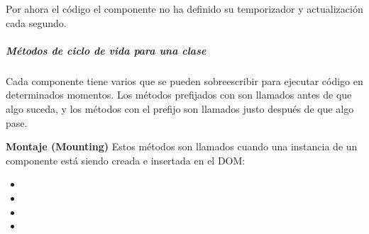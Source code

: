 %
\begin{sphinxVerbatim}[commandchars=\\\{\}]
    
   
        

   
     

   
\end{sphinxVerbatim}

Por ahora el código el componente no ha definido su temporizador y actualización
cada segundo.


\subparagraph{Métodos de ciclo de vida para una clase}
\label{\detokenize{reactjs:metodos-de-ciclo-de-vida-para-una-clase}}
Cada componente tiene varios  que se pueden
sobreescribir para ejecutar código en determinados momentos. Los métodos
prefijados con  son llamados antes de que algo suceda, y los métodos
con el prefijo  son llamados justo después de que algo pase.


\textbf{Montaje (Mounting)}
\label{\detokenize{reactjs:montaje-mounting}}
Estos métodos son llamados cuando una instancia de un componente está siendo
creada e insertada en el DOM:
\begin{itemize}
\item {} 

\item {} 

\item {} 

\item {} 

\end{itemize}


